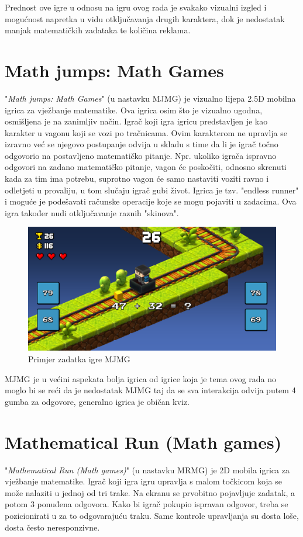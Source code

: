 \documentclass[times, utf8, zavrsni, numeric]{fer}
\begin{document}
	 Prednost ove igre u odnosu na igru ovog rada je svakako vizualni izgled i mogućnost napretka u vidu otključavanja drugih karaktera, dok je nedostatak manjak matematičkih zadataka te količina reklama. 
	
	
	\section{Math jumps: Math Games}
	"\textit{Math jumps: Math Games}"\cite{mathjump} (u nastavku MJMG) je vizualno lijepa 2.5D mobilna igrica za vježbanje matematike. Ova igrica osim što je vizualno ugodna, osmišljena je na zanimljiv način. Igrač koji igra igricu predstavljen je kao karakter
	u vagonu koji se vozi po tračnicama. Ovim karakterom ne upravlja se izravno već se njegovo postupanje odvija u skladu s time da li je igrač točno odgovorio na postavljeno matematičko pitanje. Npr. ukoliko igrača ispravno odgovori na zadano matematičko
	pitanje, vagon će poskočiti, odnosno skrenuti kada za tim ima potrebu, suprotno vagon će samo nastaviti voziti ravno i odletjeti u provaliju, u tom slučaju igrač gubi život. Igrica je tzv. "endless runner" i moguće je podešavati računske operacije
	koje se mogu pojaviti u zadacima. Ova igra također nudi otključavanje raznih "skinova".
	
	\begin{figure}[H]
		\includegraphics[scale = 0.2]{"slike/igre/mathjumps.png"} 
		\centering
		\caption{Primjer zadatka igre MJMG}
		\label{fig:mjmg}
	\end{figure}
	
	MJMG je u većini aspekata bolja igrica od igrice koja je tema ovog rada no moglo bi se reći da je nedostatak MJMG taj da se sva interakcija odvija putem 4 gumba za odgovore, generalno igrica je običan kviz.
	
	
	\section{Mathematical Run (Math games)}
	"\textit{Mathematical Run (Math games)}"\cite{mathrun} (u nastavku MRMG) je 2D mobila igrica za vježbanje matematike. Igrač koji igra igru upravlja s malom točkicom koja se može nalaziti u jednoj od tri trake. Na ekranu se prvobitno pojavljuje zadatak, a potom 3
	ponuđena odgovora. Kako bi igrač pokupio ispravan odgovor, treba se pozicionirati u za to odgovarajuću traku. Same kontrole upravljanja su dosta loše, dosta često neresponzivne.
	
\end{document}
